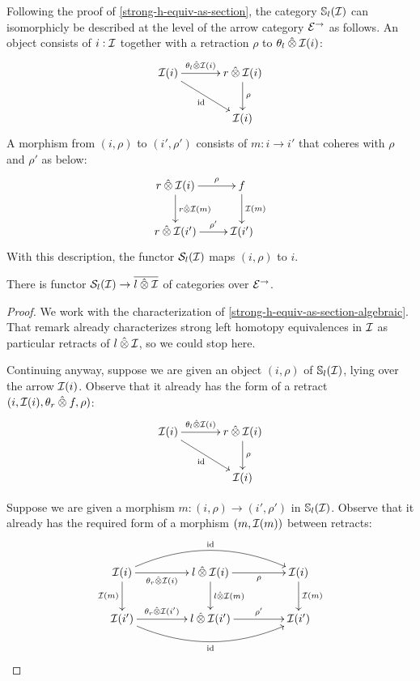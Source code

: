 \documentclass[reqno,10pt,a4paper,oneside]{amsart}
\begin{document}
\begin{remark}
\label{strong-h-equiv-as-section-algebraic}
Following the proof of \cref{strong-h-equiv-as-section}, the category $\cat{S}_l(\cal{I})$ can isomorphicly be described at the level of the arrow category $\catE^{\to}$ as follows.
An object consists of $i : \cal{I}$ together with a retraction $\rho$ to $\thetal \hatotimes \cal{I}(i)$:
\[
\xymatrix@C+1em{
  \cal{I}(i)
  \ar[r]^-{\thetal \hatotimes \cal{I}(i)}
  \ar[dr]_{\id}
&
  \intervalr \hatotimes \cal{I}(i) \ar[d]^{\rho}
\\&
  \cal{I}(i)
}
\]
A morphism from $(i, \rho)$ to $(i', \rho')$ consists of $m : i \to i'$ that coheres with $\rho$ and $\rho'$ as below:
\[
\xymatrix{
  \intervalr \hatotimes \cal{I}(i)
  \ar[r]^-{\rho}
  \ar[d]^{\intervalr \hatotimes \cal{I}(m)}
&
  f
  \ar[d]^{\cal{I}(m)}
\\
  \intervalr \hatotimes \cal{I}(i')
  \ar[r]^-{\rho'}
&
  \cal{I}(i')
}
\]
With this description, the functor $\cal{S}_l(\cal{I})$ maps $(i, \rho)$ to $i$.
\end{remark}

\begin{lemma}
\label{she-to-retract-closure}
There is functor $\cal{S}_l(\cal{I}) \to \overline{\intervall \hatotimes \cal{I}}$ of categories over $\catE^{\to}$.
\end{lemma}

\begin{proof}
We work with the characterization of \cref{strong-h-equiv-as-section-algebraic}.
That remark already characterizes strong left homotopy equivalences in $\cal{I}$ as particular retracts of $\intervall \hatotimes \cal{I}$, so we could stop here.

Continuing anyway, suppose we are given an object $(i, \rho)$ of $\cat{S}_l(\cal{I})$, lying over the arrow $\cal{I}(i)$.
Observe that it already has the form of a retract $(i, \cal{I}(i), \thetar \hatotimes f, \rho)$:
\[
\xymatrix@C+1em{
  \cal{I}(i)
  \ar[r]^-{\thetal \hatotimes \cal{I}(i)}
  \ar[dr]_{\id}
&
  \intervalr \hatotimes \cal{I}(i) \ar[d]^{\rho}
\\&
  \cal{I}(i)
}
\]

Suppose we are given a morphism $m : (i, \rho) \to (i', \rho')$ in $\cat{S}_l(\cal{I})$.
Observe that it already has the required form of a morphism $(m, \cal{I}(m))$ between retracts:
\[
\xymatrix@C+2em{
  \cal{I}(i)
  \ar[r]_-{\thetar \hatotimes \cal{I}(i)}
  \ar[d]_{\cal{I}(m)}
  \ar@/^2em/[rr]^{\id}
&
  \intervall \hatotimes \cal{I}(i)
  \ar[r]_-{\rho}
  \ar[d]^{\intervall \hatotimes \cal{I}(m)}
&
  \cal{I}(i)
  \ar[d]^{\cal{I}(m)}
\\
  \cal{I}(i')
  \ar[r]^-{\thetar \hatotimes \cal{I}(i')}
  \ar@/_2em/[rr]_{\id}
&
  \intervall \hatotimes \cal{I}(i')
  \ar[r]^-{\rho'}
&
  \cal{I}(i')
}
\]
\end{proof}
\end{document}
